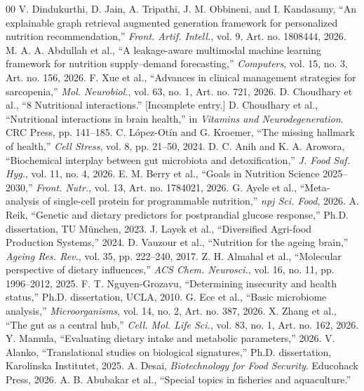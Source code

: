 \documentclass[conference]{IEEEtran}
\begin{document}
\begin{thebibliography}{00}
 V. Dindukurthi, D. Jain, A. Tripathi, J. M. Obbineni, and I. Kandasamy, ``An explainable graph retrieval augmented generation framework for personalized nutrition recommendation,'' \textit{Front. Artif. Intell.}, vol. 9, Art. no. 1808444, 2026.
 M. A. A. Abdullah et al., ``A leakage-aware multimodal machine learning framework for nutrition supply--demand forecasting,'' \textit{Computers}, vol. 15, no. 3, Art. no. 156, 2026.
 F. Xue et al., ``Advances in clinical management strategies for sarcopenia,'' \textit{Mol. Neurobiol.}, vol. 63, no. 1, Art. no. 721, 2026.
 D. Choudhary et al., ``8 Nutritional interactions.'' [Incomplete entry.]
 D. Choudhary et al., ``Nutritional interactions in brain health,'' in \textit{Vitamins and Neurodegeneration}. CRC Press, pp. 141--185.
 C. López-Otín and G. Kroemer, ``The missing hallmark of health,'' \textit{Cell Stress}, vol. 8, pp. 21--50, 2024.
 D. C. Anih and K. A. Arowora, ``Biochemical interplay between gut microbiota and detoxification,'' \textit{J. Food Saf. Hyg.}, vol. 11, no. 4, 2026.
 E. M. Berry et al., ``Goals in Nutrition Science 2025--2030,'' \textit{Front. Nutr.}, vol. 13, Art. no. 1784021, 2026.
 G. Ayele et al., ``Meta-analysis of single-cell protein for programmable nutrition,'' \textit{npj Sci. Food}, 2026.
 A. Reik, ``Genetic and dietary predictors for postprandial glucose response,'' Ph.D. dissertation, TU München, 2023.
 J. Layek et al., ``Diversified Agri-food Production Systems,'' 2024.
 D. Vauzour et al., ``Nutrition for the ageing brain,'' \textit{Ageing Res. Rev.}, vol. 35, pp. 222--240, 2017.
 Z. H. Almahal et al., ``Molecular perspective of dietary influences,'' \textit{ACS Chem. Neurosci.}, vol. 16, no. 11, pp. 1996--2012, 2025.
 F. T. Nguyen-Grozavu, ``Determining insecurity and health status,'' Ph.D. dissertation, UCLA, 2010.
 G. Ece et al., ``Basic microbiome analysis,'' \textit{Microorganisms}, vol. 14, no. 2, Art. no. 387, 2026.
 X. Zhang et al., ``The gut as a central hub,'' \textit{Cell. Mol. Life Sci.}, vol. 83, no. 1, Art. no. 162, 2026.
 Y. Mamula, ``Evaluating dietary intake and metabolic parameters,'' 2026.
 V. Alanko, ``Translational studies on biological signatures,'' Ph.D. dissertation, Karolinska Institutet, 2025.
 A. Desai, \textit{Biotechnology for Food Security}. Educohack Press, 2026.
 A. B. Abubakar et al., ``Special topics in fisheries and aquaculture.''
\end{thebibliography}
\end{document}
